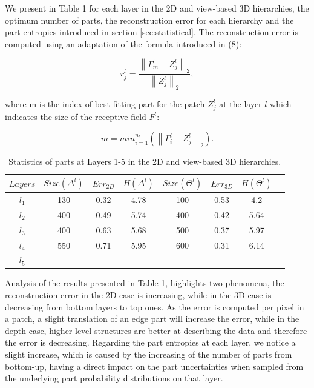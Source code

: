 \documentclass[runningheads]{llncs}
\begin{document}
We present in Table 1 for each layer in the 2D and view-based 3D hierarchies, the optimum number of parts, the reconstruction error for each hierarchy and the part entropies introduced in section \ref{sec:statistical}. The reconstruction error is computed using an adaptation of the formula introduced in (8):

\begin{equation}
 r_j^l = \frac{\left\|\Gamma_m^l-Z_j^l\right\|_2}{\left\|Z_j^l\right\|_2}, \end{equation}
 
 where m is the index of best fitting part for the patch $Z_j^l$ at the layer $l$ which indicates the size of the receptive field $F^l$:
 
\begin{equation}
 m=min_{i=1}^{n_l}(\left\|\Gamma_i^l-Z_j^l\right\|_2).
\end{equation}

 \begin{table}
 \begin{center}
  \begin{tabular}{ | c | c | c | c | c | c | c |r |}
      \hline
      $Layers$  & $Size(\Delta^l)$ & $Err_{2D}$ & $H(\Delta^l)$ &  $Size(\Theta^l)$ & $Err_{3D}$ & $H(\Theta^l)$  \\ \hline
    $l_1$ &  130  & 0.32 & 4.78 & 100 & 0.53 & 4.2 \\ \hline
    $l_2$ &  400 & 0.49 & 5.74 & 400 & 0.42 & 5.64 \\ \hline
    $l_3$ &  400 & 0.63 & 5.68 & 500 & 0.37 & 5.97 \\ \hline 
    $l_4$ &  550 & 0.71 & 5.95 & 600 & 0.31 & 6.14 \\ \hline
    $l_5$ &   &  &  &  &  &  \\ 
    \hline
  \end{tabular}
\end{center}
\caption{Statistics of parts at Layers 1-5 in the 2D and view-based 3D hierarchies.}
\end{table}

Analysis of the results presented in Table 1, highlights two phenomena, the reconstruction error in the 2D case is increasing, while in the 3D case is decreasing from bottom layers to top ones. As the error is computed per pixel in a patch, a slight translation of an edge part will increase the error, while in the depth case, higher level structures are better at describing the data and therefore the error is decreasing. Regarding the part entropies at each layer, we notice a slight increase, which is caused by the increasing of the number of parts from bottom-up, having a direct impact on the part uncertainties when sampled from the underlying part probability distributions on that layer.
\end{document}
